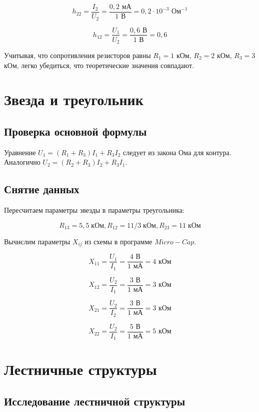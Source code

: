 \documentclass[a4paper, 12pt]{article} %
\begin{document}
$$ h_{22} = \frac{I_2}{U_2} = \frac{0,2 \text{ мА}}{1 \text{ В}} = 0,2 \cdot 10^{-3} \text{ Ом}^{-1}$$

$$ h_{12} = \frac{U_1}{U_2} = \frac{0,6 \text{ В}}{1 \text{ В}} = 0,6$$

Учитывая, что сопротивления резисторов равны $R_1 = 1$ кОм, $R_2 = 2$ кОм, $R_3 = 3$ кОм, легко убедиться, что теоретические значения совпадают.

\section{Звезда и треугольник}

\subsection{Проверка основной формулы}

Уравнение $U_1 = (R_1 + R_3)I_1 + R_3I_2$ следует из закона Ома для контура. Аналогично $U_2 = (R_2 + R_3)I_2 + R_3I_1$.

\subsection{Снятие данных}

Пересчитаем параметры звезды в параметры треугольника:

$$R_{13} = 5,5 \; \text{кОм}, R_{12} = 11/3 \; \text{кОм}, R_{23} = 11 \; \text{кОм} $$

Вычислим параметры $X_{ij}$ из схемы в программе $Micro-Cap$.

$$ X_{11} = \frac{U_1}{I_1} = \frac{4 \text{ В}}{1 \text{ мА}} = 4 \text{ кОм}$$

$$ X_{12} = \frac{U_2}{I_1} = \frac{3 \text{ В}}{1 \text{ мА}} = 3 \text{ кОм}$$

$$ X_{21} = \frac{U_2}{I_2} = \frac{3 \text{ В}}{1 \text{ мА}} = 3 \text{ кОм}$$

$$ X_{22} = \frac{U_2}{I_1} = \frac{5 \text{ В}}{1 \text{ мА}} = 5 \text{ кОм}$$

\section{Лестничные структуры}

\subsection{Исследование лестничной структуры}
\end{document}
